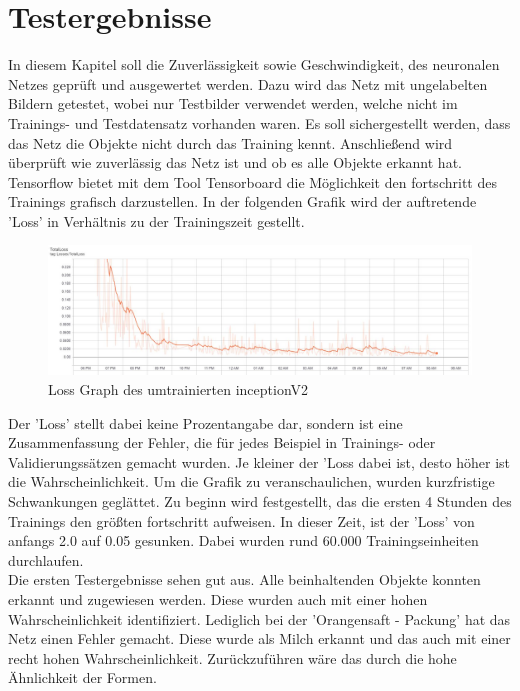 \documentclass[a4paper,12pt,oneside]{article}
\begin{document}
\section{Testergebnisse}
In diesem Kapitel soll die Zuverlässigkeit sowie Geschwindigkeit, des neuronalen Netzes geprüft und ausgewertet werden. Dazu wird das Netz mit ungelabelten Bildern getestet, wobei nur Testbilder verwendet werden, welche nicht im Trainings- und Testdatensatz vorhanden waren. Es soll sichergestellt werden, dass das Netz die Objekte nicht durch das Training kennt. Anschließend wird überprüft wie zuverlässig das Netz ist und ob es alle Objekte erkannt hat. 
\\
Tensorflow bietet mit dem Tool Tensorboard die Möglichkeit den fortschritt des Trainings grafisch darzustellen. In der folgenden Grafik wird der auftretende 'Loss' in Verhältnis zu der Trainingszeit gestellt. 
\\
\begin{figure}
    [h]
	\centering
	\includegraphics[scale=0.4]{Sources/loss_graph_200000.jpg}
	\caption{Loss Graph des umtrainierten inceptionV2}
	\label{img:loss_graph_200000}
\end{figure}

Der 'Loss' stellt dabei keine Prozentangabe dar, sondern ist eine Zusammenfassung der Fehler, die für jedes Beispiel in Trainings- oder Validierungssätzen gemacht wurden. Je kleiner der 'Loss dabei ist, desto höher ist die Wahrscheinlichkeit. Um die Grafik zu veranschaulichen, wurden kurzfristige Schwankungen geglättet. Zu beginn wird festgestellt, das die ersten 4 Stunden des Trainings den größten fortschritt aufweisen. In dieser Zeit, ist der 'Loss' von anfangs 2.0 auf 0.05 gesunken. Dabei wurden rund 60.000 Trainingseinheiten durchlaufen.\\
Die ersten Testergebnisse sehen gut aus. Alle beinhaltenden Objekte konnten erkannt und zugewiesen werden. Diese wurden auch mit einer hohen Wahrscheinlichkeit identifiziert. Lediglich bei der 'Orangensaft - Packung' hat das Netz einen Fehler gemacht. Diese wurde als Milch erkannt und das auch mit einer recht hohen Wahrscheinlichkeit. Zurückzuführen wäre das durch die hohe Ähnlichkeit der Formen.
\\
\end{document}
